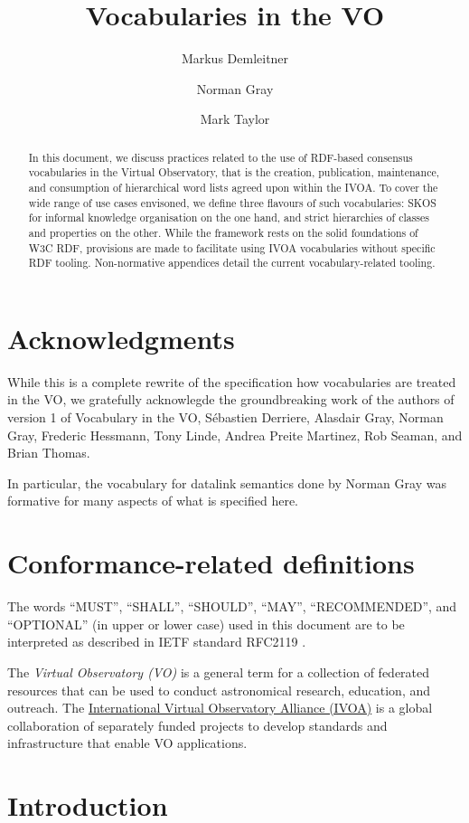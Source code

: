 \documentclass[11pt,a4paper]{ivoa}
\title{Vocabularies in the VO}
\author[https://wiki.ivoa.net/twiki/bin/view/IVOA/MarkusDemleitner]{Markus
Demleitner}
\author[https://wiki.ivoa.net/twiki/bin/view/IVOA/NormanGray]{Norman
Gray}
\author[https://wiki.ivoa.net/twiki/bin/view/IVOA/MarkTaylor]{Mark
Taylor}
\begin{document}
\begin{abstract}
In this document, we discuss practices related to the use of RDF-based
consensus vocabularies in the Virtual Observatory, that is the creation,
publication, maintenance, and consumption of 
hierarchical word lists agreed upon within the IVOA.
To cover the wide range of use cases envisoned, we define three flavours
of such vocabularies: SKOS for informal knowledge organisation on the
one hand, and strict hierarchies of classes and properties on the other.
While the framework rests on the solid foundations of W3C RDF,
provisions are made to facilitate using IVOA vocabularies without
specific RDF tooling.
Non-normative appendices detail the current vocabulary-related tooling.
\end{abstract}


\section*{Acknowledgments}

While this is a complete rewrite of the specification how vocabularies
are treated in the VO, we gratefully acknowlegde the groundbreaking work
of the authors of version 1 of Vocabulary in the VO, S\'ebastien
Derriere, Alasdair Gray, Norman Gray, Frederic Hessmann, Tony Linde,
Andrea Preite Martinez, Rob Seaman, and Brian Thomas.

In particular, the vocabulary for datalink semantics done by Norman Gray
was formative for many aspects of what is specified here.

\section*{Conformance-related definitions}

The words ``MUST'', ``SHALL'', ``SHOULD'', ``MAY'', ``RECOMMENDED'', and
``OPTIONAL'' (in upper or lower case) used in this document are to be
interpreted as described in IETF standard RFC2119 \citep{std:RFC2119}.

The \emph{Virtual Observatory (VO)} is a
general term for a collection of federated resources that can be used
to conduct astronomical research, education, and outreach.
The \href{http://www.ivoa.net}{International
Virtual Observatory Alliance (IVOA)} is a global
collaboration of separately funded projects to develop standards and
infrastructure that enable VO applications.

\section{Introduction}
\end{document}
